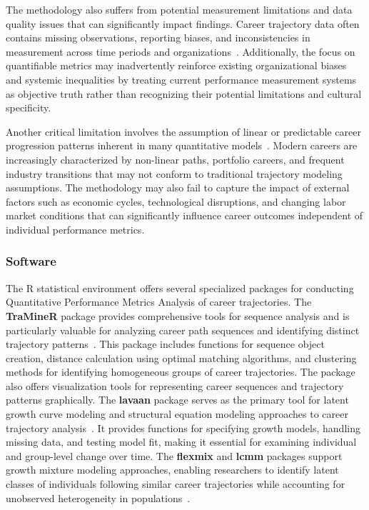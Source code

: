 \documentclass[main.tex]{subfiles}
\begin{document}
The methodology also suffers from potential measurement limitations and data quality issues that can significantly impact findings. Career trajectory data often contains missing observations, reporting biases, and inconsistencies in measurement across time periods and organizations~\parencite{gmm_missing,gmm_resilience}. Additionally, the focus on quantifiable metrics may inadvertently reinforce existing organizational biases and systemic inequalities by treating current performance measurement systems as objective truth rather than recognizing their potential limitations and cultural specificity.

Another critical limitation involves the assumption of linear or predictable career progression patterns inherent in many quantitative models~\parencite{beyond_numbers}. Modern careers are increasingly characterized by non-linear paths, portfolio careers, and frequent industry transitions that may not conform to traditional trajectory modeling assumptions. The methodology may also fail to capture the impact of external factors such as economic cycles, technological disruptions, and changing labor market conditions that can significantly influence career outcomes independent of individual performance metrics.

\subsubsection{Software}

The R statistical environment offers several specialized packages for conducting Quantitative Performance Metrics Analysis of career trajectories. The \textbf{TraMineR} package provides comprehensive tools for sequence analysis and is particularly valuable for analyzing career path sequences and identifying distinct trajectory patterns~\parencite{career_patterns_europe}. This package includes functions for sequence object creation, distance calculation using optimal matching algorithms, and clustering methods for identifying homogeneous groups of career trajectories. The package also offers visualization tools for representing career sequences and trajectory patterns graphically. The \textbf{lavaan} package serves as the primary tool for latent growth curve modeling and structural equation modeling approaches to career trajectory analysis~\parencite{latent_growth_columbia,job_satisfaction}. It provides functions for specifying growth models, handling missing data, and testing model fit, making it essential for examining individual and group-level change over time. The \textbf{flexmix} and \textbf{lcmm} packages support growth mixture modeling approaches, enabling researchers to identify latent classes of individuals following similar career trajectories while accounting for unobserved heterogeneity in populations~\parencite{residual_gmm,gmm_resilience}.
\end{document}
